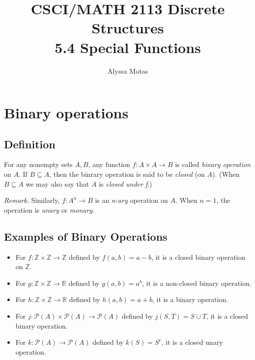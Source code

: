 \documentclass[11pt]{article}
\title{\textbf{CSCI/MATH 2113 Discrete Structures} \\ 5.4 Special Functions}
\author{Alyssa Motas}
\begin{document}
    \maketitle

    \pagebreak

    \tableofcontents

    \pagebreak

    \section{Binary operations}
    \subsection{Definition}

    For any nonempty sets \(A,B\), any function \(f: A \times A \rightarrow B\) is called \emph{binary operation} on $A$. If \(B \subseteq A\), then the binrary operation is said to be \emph{closed} (on $A$). (When \(B \subseteq A\) we may also say that $A$ is \emph{closed under f}.)

    \vspace{1em}

    \emph{Remark.} Similarly, \(f : A^n \rightarrow B\) is an \emph{n-ary} operation on $A$. When $n=1$, the operation is \emph{unary} or \emph{monary}.

    \subsection{Examples of Binary Operations}
    \begin{itemize}
        \item For \(f: \mathbb{Z} \times \mathbb{Z} \rightarrow \mathbb{Z}\) defined by \(f(a,b) = a - b\), it is a closed binary operation on \(\mathbb{Z}\).
        \item For \(g: \mathbb{Z} \times \mathbb{Z} \rightarrow \mathbb{R}\) defined by \(g(a,b) = a^b\), it is a non-closed binary operation.
        \item For \(h: \mathbb{Z} \times \mathbb{Z} \rightarrow \mathbb{R}\) defined by \(h(a,b) = a + b\), it is a binary operation.
        \item For \(j: \mathcal{P}(A) \times \mathcal{P}(A) \rightarrow \mathcal{P}(A)\) defined by \(j(S,T) = S \cup T\), it is a closed binary operation.
        \item For \(k: \mathcal{P}(A) \rightarrow \mathcal{P}(A)\) defined by \(k(S) = S^c\), it is a closed unary operation.
    \end{itemize}
\end{document}
